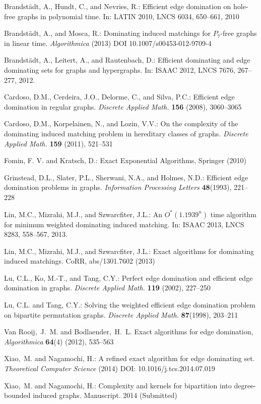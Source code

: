 \documentclass{elsart_TR2}
\begin{document}
\begin{thebibliography}{99}
Brandst\"{a}dt, A., Hundt, C., and Nevries, R.:
Efficient edge domination on hole-free
graphs in polynomial time. In:  LATIN 2010, LNCS 6034,  650--661, 2010

Brandst\"{a}dt, A., and Mosca, R.:
Dominating induced matchings for $P_7$-free graphs in linear time.
\emph{Algorithmica} (2013) DOI 10.1007/s00453-012-9709-4

Brandst\"{a}dt, A., Leitert, A., and Rautenbach, D.:
Efficient dominating and edge dominating sets for graphs and hypergraphs.
In: ISAAC 2012, LNCS 7676,  267--277, 2012.

Cardoso, D.M., Cerdeira, J.O., Delorme, C., and Silva, P.C.:
Efficient edge domination in regular graphs.
\emph{Discrete Applied Math.} \textbf{156} (2008), 3060--3065

Cardoso, D.M., Korpelainen, N., and Lozin, V.V.:
On the complexity of the dominating induced matching problem in hereditary classes of graphs.
\emph{Discrete Applied Math.} \textbf{159} (2011), 521--531

Fomin, F. V.  and Kratsch, D.:
\newblock Exact Exponential Algorithms, Springer (2010)

Grinstead, D.L., Slater, P.L., Sherwani, N.A., and Holmes, N.D.:
Efficient edge domination problems in graphs.
\emph{Information Processing Letters} \textbf{48}(1993), 221--228


Lin, M.C., Mizrahi, M.J., and Szwarcfiter, J.L.:
An $O^*(1.1939^n)$ time algorithm for minimum
weighted dominating induced matching.
In: ISAAC 2013, LNCS 8283,  558--567, 2013.

Lin, M.C., Mizrahi, M.J., and Szwarcfiter, J.L.:
Exact algorithms for dominating induced matchings. CoRR, abs/1301.7602 (2013)


Lu, C.L., Ko, M.-T., and Tang, C.Y.:
Perfect edge domination and efficient edge domination
in graphs.
\emph{Discrete Applied Math.} \textbf{119} (2002), 227--250

Lu, C.L. and Tang, C.Y.:
Solving the weighted efficient edge domination problem on bipartite permutation graphs.
\emph{Discrete Applied Math.} \textbf{87}(1998), 203--211

Van Rooij,~J.~M. and  Bodlaender,~H.~L.
Exact algorithms for edge domination,
\emph{Algorithmica} \textbf{64}(4) (2012),  535--563

Xiao,~M.  and Nagamochi, H.:
\newblock A refined exact algorithm for edge dominating set.
\newblock \emph{Theoretical Computer Science }(2014) DOI: 10.1016/j.tcs.2014.07.019

Xiao,~M.  and Nagamochi, H.:
\newblock Complexity and kernels for bipartition into degree-bounded induced graphs.
\newblock Manuscript. 2014 (Submitted)





\end{thebibliography}
\end{document}
